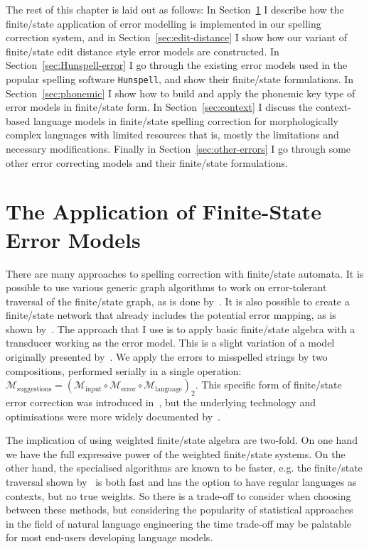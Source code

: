 \documentclass[officiallayout]{unihelcompling}
\begin{document}
The rest of this chapter is laid out as follows: In
Section~\ref{sec:error-application} I describe how the finite\-/state
application of error modelling is implemented in our spelling correction
system, and in Section~\ref{sec:edit-distance} I show how our variant of
finite\-/state edit distance style error models are constructed.  In
Section~\ref{sec:Hunspell-error} I go through the existing error models used in
the popular spelling software \texttt{Hunspell}, and show their finite\-/state
formulations. In Section~\ref{sec:phonemic} I show how to build and apply the
phonemic key type of error models in finite\-/state form.  In
Section~\ref{sec:context} I discuss the context-based language models in
finite\-/state spelling correction for morphologically complex languages with
limited resources that is, mostly the limitations and necessary modifications.
Finally in Section~\ref{sec:other-errors} I go through some other error
correcting models and their finite\-/state formulations.

\section{The Application of Finite-State Error Models}
\label{sec:error-application}

There are many approaches to spelling correction with finite\-/state automata.
It is possible to use various generic graph algorithms to work on
error-tolerant traversal of the finite\-/state graph, as is done
by~\citet{hulden2009fast}.  It is also possible to create a finite\-/state
network that already includes the potential error mapping, as is shown
by~\citet{schulz2002fast}. The approach that I use is to apply basic
finite\-/state algebra with a transducer working as the error model. This is a
slight variation of a model originally presented by~\citet{mohri2003edit}. We
apply the errors to misspelled strings by two compositions, performed serially
in a single operation: $\mathcal{M}_{\mathrm{suggestions}} =
(\mathcal{M}_{\mathrm{input}} \circ \mathcal{M}_{\mathrm{error}} \circ
\mathcal{M}_{\mathrm{language}})_2$.  This specific form of finite\-/state
error correction was introduced in~, but the
underlying technology and optimisations were more widely documented
by~\citet{linden2011hfst}.

The implication of using weighted finite\-/state algebra are two-fold. On one
hand we have the full expressive power of the weighted finite\-/state
systems.  On the other hand, the specialised algorithms are known to be faster,
e.g.  the finite\-/state traversal shown by~\citet{hulden2009fast} is both fast
and has the option to have regular languages as contexts, but no true weights.
So there is a trade-off to consider when choosing between these methods, but
considering the popularity of statistical approaches in the field of natural
language engineering the time trade-off may be palatable for most end-users
developing language models.
\end{document}
